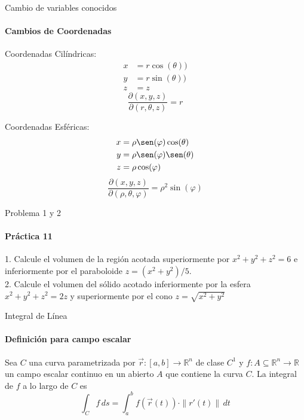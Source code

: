 \documentclass{plantillaPPT}
\begin{document}
\primeraDiapo

\begin{frame}{Cambio de variables conocidos}
    \framesubtitle{Cambios de Coordenadas}

    \begin{minipage}{0.45\textwidth}
    \centering
        Coordenadas Cilíndricas:
        \begin{align*}
            x &= r\cos(\theta)) \\
            y &= r\sin(\theta)) \\
            z &= z
        \end{align*}
        \vspace{0.1cm}
        \begin{equation*}
            \frac{\partial(x,y,z)}{\partial(r,\theta, z)} = r
        \end{equation*}
    \end{minipage}
    \begin{minipage}{0.45\textwidth}
        \centering
        Coordenadas Esféricas:
        \begin{align*}
            x &= \rho\sen(\varphi)\cos(\theta) \\
            y &= \rho\sen(\varphi)\sen(\theta) \\
            z &= \rho\cos(\varphi)
        \end{align*}
        \vspace{0.1cm}
        \begin{equation*}
             \frac{\partial(x,y,z)}{\partial(\rho,\theta, \varphi)} = \rho^2\sin(\varphi)
        \end{equation*}
    \end{minipage}
\end{frame}

\begin{frame}{Problema 1 y 2}
    \framesubtitle{Práctica  11}
    1. Calcule el volumen de la región acotada superiormente por $x^2+y^2+z^2=6$ e inferiormente por el paraboloide $z=(x^2+y^2)/5$.
    \\
    \vspace{1cm}
    2. Calcule el volumen del sólido acotado inferiormente por la esfera $x^2+y^2+z^2=2z$ y superiormente por el cono $z=\sqrt{x^2+y^2}$
\end{frame}

\begin{frame}{Integral de Línea}
\framesubtitle{Definición para campo escalar}

\begin{definicion}
    Sea $C$ una curva parametrizada por $\vec{r}:[a,b] \to \mathbb{R}^n$ de clase $C^1$ y $f:A\subseteq\mathbb{R}^n\to\mathbb{R}$ un campo escalar continuo en un abierto $A$ que contiene la curva $C$. La integral de $f$ a lo largo de $C$ es
    \begin{equation*}
        \int_C f\,ds = \int_a^b f(\vec{r}(t)) \cdot \|r'(t)\|\,dt
    \end{equation*}
\end{definicion}
    
    
\end{frame}
\end{document}
